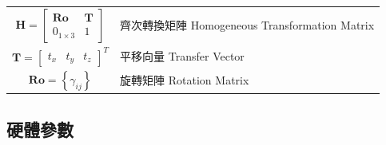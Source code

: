\begin{longtable}[l]{cl}
    $\boldsymbol{H}=\left[\begin{array}{cc}
         \boldsymbol{Ro}  & \boldsymbol{T} \\
        0_{1\times3} & 1
        \end{array}\right]$ & 齊次轉換矩陣 Homogeneous Transformation Matrix\\
    $\boldsymbol{T}=\left[\begin{array}{ccc}t_x&t_y&t_z\end{array}\right]^T$ & 平移向量 Transfer Vector\\
    $\boldsymbol{Ro}=\left\{\gamma_{ij}\right\}$ & 旋轉矩陣 Rotation Matrix\\
\end{longtable}








\onehalfspacing

\subsection*{硬體參數}

